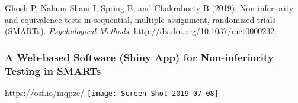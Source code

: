 \documentclass[10pt,xcolor=dvipsnames]{beamer}
\begin{document}
\begin{frame}[plain]
\begin{itemize}
\end{itemize}
{\small
\begin{thebibliography}{1}
Ghosh P, Nahum-Shani I, Spring B, and Chakraborty B (2019). Non-inferiority and equivalence tests in sequential, multiple assignment, randomized trials (SMARTs). {\em Psychological Methods}: http://dx.doi.org/10.1037/met0000232.
\end{thebibliography}
}
\end{frame}




\begin{frame}
\frametitle{A Web-based Software (Shiny App) for Non-inferiority Testing in SMARTs}
\begin{center}
{\color{blue}https://osf.io/mqpze/}
\texttt{[image: Screen-Shot-2019-07-08]}
\end{center}
\end{frame}


%
%
\end{document}
